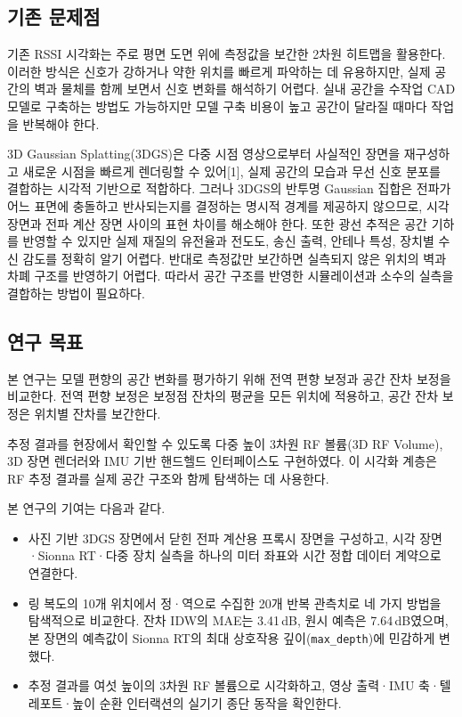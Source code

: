 \documentclass[11pt,a4paper]{article}
\newcommand{\md}{\texttt{max\_depth}}
\begin{document}
\subsection{기존 문제점}

기존 RSSI 시각화는 주로 평면 도면 위에 측정값을 보간한 2차원 히트맵을 활용한다. 이러한 방식은 신호가
강하거나 약한 위치를 빠르게 파악하는 데 유용하지만, 실제 공간의 벽과 물체를 함께 보면서 신호 변화를
해석하기 어렵다. 실내 공간을 수작업 CAD 모델로 구축하는 방법도 가능하지만 모델 구축 비용이 높고 공간이
달라질 때마다 작업을 반복해야 한다.

3D Gaussian Splatting(3DGS)은 다중 시점 영상으로부터 사실적인 장면을 재구성하고 새로운 시점을 빠르게
렌더링할 수 있어[1], 실제 공간의 모습과 무선 신호 분포를 결합하는 시각적 기반으로 적합하다. 그러나
3DGS의 반투명 Gaussian 집합은 전파가 어느 표면에 충돌하고 반사되는지를 결정하는 명시적 경계를 제공하지
않으므로, 시각 장면과 전파 계산 장면 사이의 표현 차이를 해소해야 한다. 또한 광선 추적은 공간 기하를
반영할 수 있지만 실제 재질의 유전율과 전도도, 송신 출력, 안테나 특성, 장치별 수신 감도를 정확히 알기
어렵다. 반대로 측정값만 보간하면 실측되지 않은 위치의 벽과 차폐 구조를 반영하기 어렵다. 따라서 공간
구조를 반영한 시뮬레이션과 소수의 실측을 결합하는 방법이 필요하다.

\subsection{연구 목표}

본 연구는 모델 편향의 공간 변화를 평가하기 위해 전역 편향 보정과 공간 잔차 보정을 비교한다. 전역 편향
보정은 보정점 잔차의 평균을 모든 위치에 적용하고, 공간 잔차 보정은 위치별 잔차를 보간한다.

추정 결과를 현장에서 확인할 수 있도록 다중 높이 3차원 RF 볼륨(3D RF Volume), 3D 장면 렌더러와 IMU
기반 핸드헬드 인터페이스도 구현하였다. 이 시각화 계층은 RF 추정 결과를 실제 공간 구조와 함께 탐색하는 데
사용한다.

본 연구의 기여는 다음과 같다.

\begin{itemize}[leftmargin=1.4em, itemsep=4pt, topsep=4pt]
  \item 사진 기반 3DGS 장면에서 닫힌 전파 계산용 프록시 장면을 구성하고, 시각 장면·Sionna RT·다중
        장치 실측을 하나의 미터 좌표와 시간 정합 데이터 계약으로 연결한다.
  \item 링 복도의 10개 위치에서 정·역으로 수집한 20개 반복 관측치로 네 가지 방법을 탐색적으로
        비교한다. 잔차 IDW의 MAE는 3.41\,dB, 원시 예측은 7.64\,dB였으며, 본 장면의 예측값이
        Sionna RT의 최대 상호작용 깊이(\md)에 민감하게 변했다.
  \item 추정 결과를 여섯 높이의 3차원 RF 볼륨으로 시각화하고, 영상 출력·IMU 축·텔레포트·높이 순환
        인터랙션의 실기기 종단 동작을 확인한다.
\end{itemize}
\end{document}
